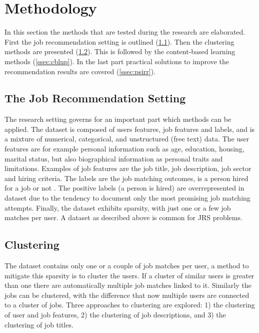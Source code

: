 \section{Methodology}
\label{sec:meth}

In this section the methods that are tested during the research are elaborated. First the job recommendation setting is outlined (\ref{ssec:jrs}). Then the clustering methods are presented (\ref{ssec:clus}). This is followed by the content-based learning methods (\ref{ssec:cblup}). In the last part practical solutions to improve the recommendation results are covered (\ref{ssec:psirr}). 

\subsection{The Job Recommendation Setting}
\label{ssec:jrs}
The research setting governs for an important part which methods can be applied.
The dataset is composed of users features, job features and labels, and is a mixture of numerical, categorical, and unstructured (free text) data.
The user features are for example personal information such as age, education, housing, marital status, but also biographical information as personal traits and limitations. 
Examples of job features are the job title, job description, job sector and hiring criteria. 
The labels are the job matching outcomes, is a person hired for a job or not . 
The positive labels (a person is hired) are overrepresented in dataset due to the tendency to document only the most promising job matching attempts. 
Finally, the dataset exhibits sparsity, with just one or a few job matches per user.
A dataset as described above is common for JRS problems.

\subsection{Clustering}
\label{ssec:clus}
The dataset contains only one or a couple of job matches per user, a method to mitigate this sparsity is to cluster the users. 
If a cluster of similar users is greater than one there are automatically multiple job matches linked to it. 
Similarly the jobs can be clustered, with the difference that now multiple users are connected to a cluster of jobs. 
Three approaches to clustering are explored: 1) the clustering of user and job features, 2) the clustering of job descriptions, and 3) the clustering of job titles. 

